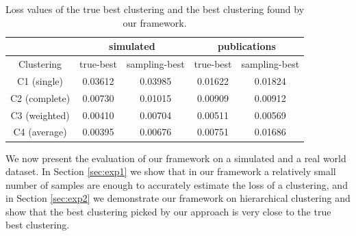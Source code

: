 \begin{table}[t]
\centering
\begin{tabular}{ |c || c|c||c|c| } 
 \hline
  & \multicolumn{2}{c||}{\textbf{simulated}} & \multicolumn{2}{|c|}{\textbf{publications}} \\ \hline
Clustering & true-best & sampling-best & true-best & sampling-best \\ \hline
C1 (single) &	0.03612	& 0.03985	&	0.01622 &	0.01824 \\ \hline
C2 (complete) &	0.00730 &	0.01015	&	0.00909	& 0.00912 \\ \hline
C3 (weighted) &	0.00410 &	0.00704	&	0.00511	& 0.00569 \\ \hline
C4 (average) &	0.00395	& 0.00676	& 0.00751	& 0.01686 \\ \hline
\end{tabular}
\caption{Loss values of the true best clustering and the best clustering found by our framework.}
\label{tab:exp3}
\end{table}


We now present the evaluation of our framework on a simulated and a real world dataset.
In Section \ref{sec:exp1} we show that in our framework a relatively small number of samples are enough to accurately estimate the loss of a clustering,
and in Section \ref{sec:exp2} we demonstrate our framework on hierarchical clustering and 
show that the best clustering picked by our approach is very close to the true best clustering.

